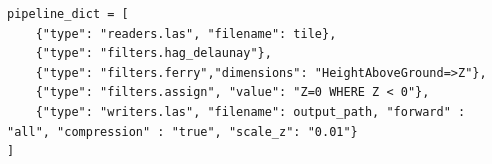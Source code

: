 \begin{lstlisting}[label={lst:pdal_normalize}, caption={[Normalisierungs-Pipeline]PDAL-Pipeline der Punktnormalisierung}, breaklines=true, breakatwhitespace=true]
pipeline_dict = [
    {"type": "readers.las", "filename": tile},
    {"type": "filters.hag_delaunay"},
    {"type": "filters.ferry","dimensions": "HeightAboveGround=>Z"},
    {"type": "filters.assign", "value": "Z=0 WHERE Z < 0"},
    {"type": "writers.las", "filename": output_path, "forward" : "all", "compression" : "true", "scale_z": "0.01"}
]
\end{lstlisting}